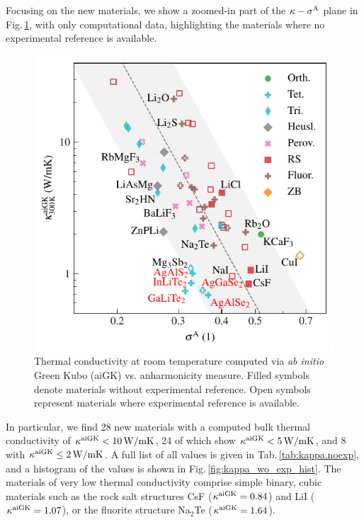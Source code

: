 Focusing on the new materials, we show a zoomed-in part of the $\kappa-\sigma^\mathrm{A}$ plane in Fig.\,\ref{fig:kappa_sigma}, with only computational data, highlighting the materials where no experimental reference is available.
%
\begin{figure}
	\includegraphics[width=\textwidth]{./data/plots/kappa_vs_sigma_trusted/kappa_vs_sigma_trusted_experiment.pdf}
	\caption{Thermal conductivity at room temperature computed via \emph{ab initio} Green Kubo (aiGK) vs. anharmonicity measure. Filled symbols denote materials without experimental reference. Open symbols represent materials where experimental reference is available.}
	\label{fig:kappa_sigma}
\end{figure}
%
In particular, we find 28 new materials with a computed bulk thermal conductivity of $\kappa^{\rm aiGK} < 10\,{\rm W/mK}$, 24 of which show $\kappa^{\rm aiGK} < 5\,{\rm W/mK}$, and 8 with $\kappa^{\rm aiGK} \leq 2\,{\rm W/mK}$. A full list of all values is given in Tab.\,\ref{tab:kappa.noexp}, and a histogram of the values is shown in Fig.\,\ref{fig:kappa_wo_exp_hist}. The materials of very low thermal conductivity comprise simple binary, cubic materials such as the rock salt structures CsF ($\kappa^{\rm aiGK} = 0.84$) and LiI ($\kappa^{\rm aiGK} = 1.07$), or the fluorite structure Na$_2$Te ($\kappa^{\rm aiGK} = 1.64$). 


